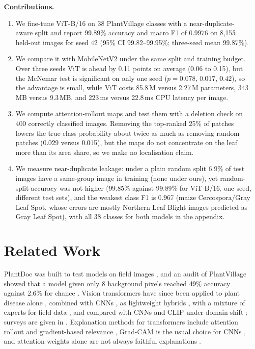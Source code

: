 \documentclass[conference]{IEEEtran}
\begin{document}
\textbf{Contributions.}
\begin{enumerate}
\item We fine-tune ViT-B/16 on 38 PlantVillage classes with a near-duplicate-aware split and report 99.89\% accuracy and macro F1 of 0.9976 on 8,155 held-out images for seed 42 (95\% CI 99.82--99.95\%; three-seed mean 99.87\%).
\item We compare it with MobileNetV2 under the same split and training budget. Over three seeds ViT is ahead by 0.11 points on average (0.06 to 0.15), but the McNemar test is significant on only one seed ($p=0.078$, $0.017$, $0.42$), so the advantage is small, while ViT costs 85.8\,M versus 2.27\,M parameters, 343\,MB versus 9.3\,MB, and 223\,ms versus 22.8\,ms CPU latency per image.
\item We compute attention-rollout maps and test them with a deletion check on 400 correctly classified images. Removing the top-ranked 25\% of patches lowers the true-class probability about twice as much as removing random patches (0.029 versus 0.015), but the maps do not concentrate on the leaf more than its area share, so we make no localisation claim.
\item We measure near-duplicate leakage: under a plain random split 6.9\% of test images have a same-group image in training (none under ours), yet random-split accuracy was not higher (99.85\% against 99.89\% for ViT-B/16, one seed, different test sets), and the weakest class F1 is 0.967 (maize Cercospora/Gray Leaf Spot, whose errors are mostly Northern Leaf Blight images predicted as Gray Leaf Spot), with all 38 classes for both models in the appendix.
\end{enumerate}

\section{Related Work}
PlantDoc was built to test models on field images \cite{singh2020plantdoc}, and an audit of PlantVillage showed that a model given only 8 background pixels reached 49\% accuracy against 2.6\% for chance \cite{noyan2022bias}. Vision transformers \cite{dosovitskiy2021vit,touvron2021deit} have since been applied to plant disease alone \cite{borhani2022}, combined with CNNs \cite{thakur2023plantxvit}, as lightweight hybrids \cite{tonmoy2025mobileplantvit}, with a mixture of experts for field data \cite{salman2025moe}, and compared with CNNs and CLIP \cite{radford2021clip} under domain shift \cite{benabbas2025rethinking}; surveys are given in \cite{mehdipour2025vitagri,banerjee2025eval}. Explanation methods for transformers include attention rollout \cite{abnar2020rollout} and gradient-based relevance \cite{chefer2021beyond}, Grad-CAM is the usual choice for CNNs \cite{selvaraju2017gradcam}, and attention weights alone are not always faithful explanations \cite{jain2019attention}.
\end{document}
